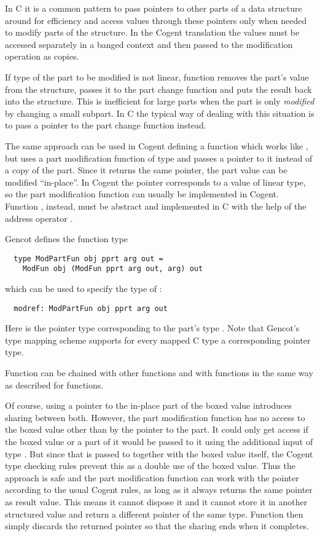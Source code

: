 In C it is a common pattern to pass pointers to other parts of a data structure around for efficiency and access values through these pointers 
only when needed to modify parts of the structure. In the Cogent translation the values must be accessed separately in a banged context and then
passed to the modification operation as copies.

If type  of the part to be modified is not linear, function  removes the part's value from the structure,
passes it to the part change function and puts the result back into the structure. This is
inefficient for large parts when the part is only \textit{modified} by changing a small subpart.
In C the typical way of dealing with this situation is to pass a pointer to the part change function 
instead. 

The same approach can be used in Cogent defining a function  which works like , but
uses a part modification function of type  and passes a pointer to it instead of a copy of the part. 
Since it returns the same pointer, the part value can be modified ``in-place''.
In Cogent the pointer corresponds to a value of linear type, so the part modification function can usually be 
implemented in Cogent. Function , instead, must be abstract and implemented in C with the help of 
the address operator \code{\&}. 

Gencot defines the function type
\begin{verbatim}
  type ModPartFun obj pprt arg out = 
    ModFun obj (ModFun pprt arg out, arg) out
\end{verbatim}
which can be used to specify the type of :
\begin{verbatim}
  modref: ModPartFun obj pprt arg out
\end{verbatim}
Here  is the pointer type corresponding to the part's type . Note that Gencot's type mapping 
scheme supports for every mapped C type a corresponding pointer type.

Function  can be chained with other  functions and with  functions in the
same way as described for  functions.

Of course, using a pointer to the in-place part of the boxed value introduces sharing between both. However, the 
part modification function has no access to the boxed value other than by the pointer to the part. It could only get
access if the boxed value or a part of it would be passed to it using the additional input of type . But since
that is passed to  together with the boxed value itself, the Cogent type checking rules prevent this
as a double use of the boxed value. Thus the approach is safe and the part modification function can work with the
pointer according to the usual Cogent rules, as long as it always returns the same pointer as result value. This
means it cannot dispose it and it cannot store it in another structured value and return a different pointer of
the same type. Function  then simply discards the returned pointer so that the sharing ends when it
completes.

